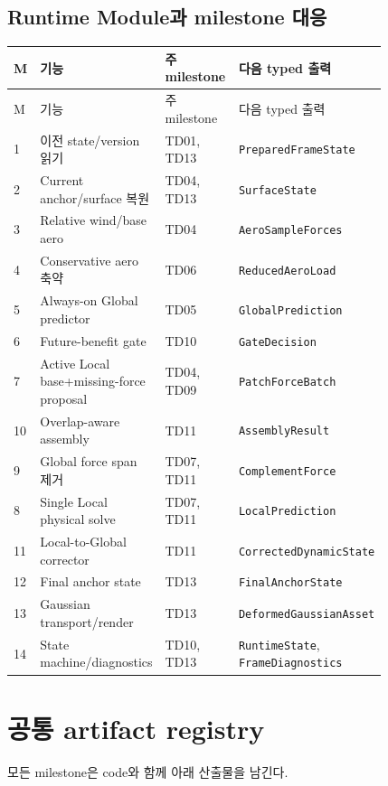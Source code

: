 \documentclass[10pt,a4paper]{article}
\newcommand{\code}[1]{\texttt{#1}}
\begin{document}
\subsection{Runtime Module과 milestone 대응}

\begin{longtable}{L{0.05\linewidth}L{0.27\linewidth}L{0.21\linewidth}L{0.29\linewidth}}
\toprule
M & 기능 & 주 milestone & 다음 typed 출력 \\
\midrule
\endfirsthead
\toprule
M & 기능 & 주 milestone & 다음 typed 출력 \\
\midrule
{} & 이전 state/version 읽기 & TD01, TD13 & \code{PreparedFrameState} \\
2 & Current anchor/surface 복원 & TD04, TD13 & \code{SurfaceState} \\
3 & Relative wind/base aero & TD04 & \code{AeroSampleForces} \\
4 & Conservative aero 축약 & TD06 & \code{ReducedAeroLoad} \\
5 & Always-on Global predictor & TD05 & \code{GlobalPrediction} \\
6 & Future-benefit gate & TD10 & \code{GateDecision} \\
7 & Active Local base+missing-force proposal & TD04, TD09 & \code{PatchForceBatch} \\
10 & Overlap-aware assembly & TD11 & \code{AssemblyResult} \\
9 & Global force span 제거 & TD07, TD11 & \code{ComplementForce} \\
8 & Single Local physical solve & TD07, TD11 & \code{LocalPrediction} \\
11 & Local-to-Global corrector & TD11 & \code{CorrectedDynamicState} \\
12 & Final anchor state & TD13 & \code{FinalAnchorState} \\
13 & Gaussian transport/render & TD13 & \code{DeformedGaussianAsset} \\
14 & State machine/diagnostics & TD10, TD13 & \code{RuntimeState}, \code{FrameDiagnostics} \\
\bottomrule
\end{longtable}

\section{공통 artifact registry}

모든 milestone은 code와 함께 아래 산출물을 남긴다.
\end{document}
